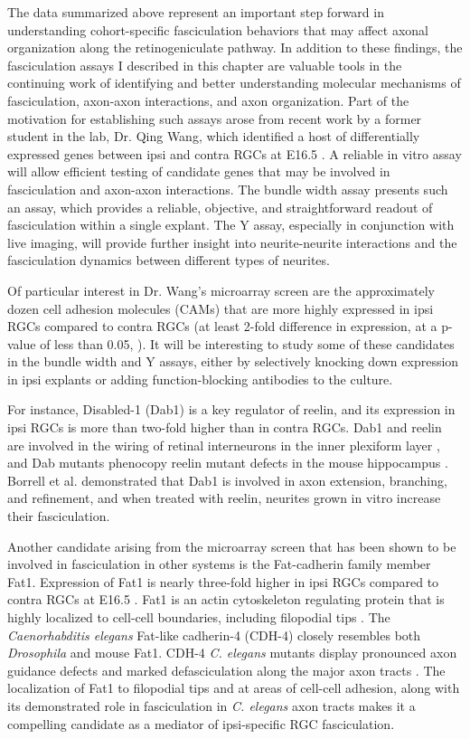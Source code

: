 \label{sec:InVitroFuture}
The data summarized above represent an important step forward in understanding cohort-specific fasciculation behaviors that may affect axonal organization along the retinogeniculate pathway.
In addition to these findings, the fasciculation assays I described in this chapter are valuable tools in the continuing work of identifying and better understanding molecular mechanisms of fasciculation, axon-axon interactions, and axon organization.
Part of the motivation for establishing such assays arose from recent work by a former student in the lab, Dr. Qing Wang, which identified a host of differentially expressed genes between ipsi and contra RGCs at E16.5 \cite{wang2016ipsilateral}.
A reliable in vitro assay will allow efficient testing of candidate genes that may be involved in fasciculation and axon-axon interactions.
The bundle width assay presents such an assay, which provides a reliable, objective, and straightforward readout of fasciculation within a single explant.
The Y assay, especially in conjunction with live imaging, will provide further insight into neurite-neurite interactions and the fasciculation dynamics between different types of neurites.

Of particular interest in Dr. Wang's microarray screen are the approximately dozen cell adhesion molecules (CAMs) that are more highly expressed in ipsi RGCs compared to contra RGCs (at least 2-fold difference in expression, at a p-value of less than 0.05, ).
It will be interesting to study some of these candidates in the bundle width and Y assays, either by selectively knocking down expression in ipsi explants or adding function-blocking antibodies to the culture.

For instance, Disabled-1 (Dab1) is a key regulator of reelin, and its expression in ipsi RGCs is more than two-fold higher than in contra RGCs.
Dab1 and reelin are involved in the wiring of retinal interneurons in the inner plexiform layer \cite{rice2001reelin}, and Dab mutants phenocopy reelin mutant defects in the mouse hippocampus \cite{borrell2007reelin}.
Borrell et al.  demonstrated that Dab1 is involved in axon extension, branching, and refinement, and when treated with reelin, neurites grown in vitro increase their fasciculation.

Another candidate arising from the microarray screen that has been shown to be involved in fasciculation in other systems is the Fat-cadherin family member Fat1.
Expression of Fat1 is nearly three-fold higher in ipsi RGCs compared to contra RGCs at E16.5 \cite{wang2016ipsilateral}.
Fat1 is an actin cytoskeleton regulating protein that is highly localized to cell-cell boundaries, including filopodial tips \cite{tanoue2004mammalian}.
The \emph{Caenorhabditis elegans} Fat-like cadherin-4 (CDH-4) closely resembles both \emph{Drosophila} and mouse Fat1.
CDH-4 \emph{C. elegans} mutants display pronounced axon guidance defects and marked defasciculation along the major axon tracts \cite{schmitz2008fat}.
The localization of Fat1 to filopodial tips and at areas of cell-cell adhesion, along with its demonstrated role in fasciculation in \emph{C. elegans} axon tracts makes it a compelling candidate as a mediator of ipsi-specific RGC fasciculation.

